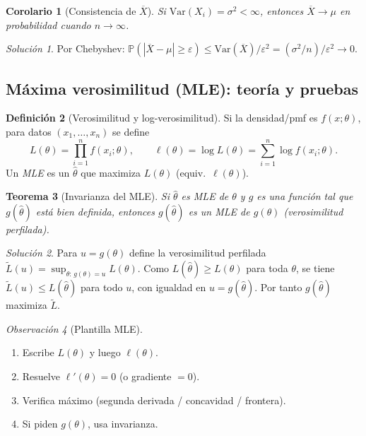 \documentclass[11pt]{article}
\theoremstyle{plain}
\newtheorem{theorem}{Teorema}[section]
\newtheorem{corollary}[theorem]{Corolario}
\theoremstyle{definition}
\newtheorem{definition}[theorem]{Definición}
\theoremstyle{remark}
\newtheorem{remark}[theorem]{Observación}
\theoremstyle{solstyle}
\newtheorem*{solution}{Solución}
\newcommand{\Var}{\mathrm{Var}}
\newcommand{\Pbb}{\mathbb{P}}
\newcommand{\1}{\mathbbm{1}}
\newcommand{\Xbar}{\overline{X}}
\begin{document}
\begin{corollary}[Consistencia de $\Xbar$]\label{cor:consistency-Xbar}
Si $\Var(X_i)=\sigma^2<\infty$, entonces $\Xbar\to \mu$ en probabilidad cuando $n\to\infty$.
\end{corollary}

\begin{solution}
Por Chebyshev: $\Pbb(|\Xbar-\mu|\ge\varepsilon)\le \Var(\Xbar)/\varepsilon^2=(\sigma^2/n)/\varepsilon^2\to 0$.
\end{solution}

\subsection{Máxima verosimilitud (MLE): teoría y pruebas}

\begin{definition}[Verosimilitud y log-verosimilitud]
Si la densidad/pmf es $f(x;\theta)$, para datos $(x_1,\dots,x_n)$ se define
\[
L(\theta)=\prod_{i=1}^n f(x_i;\theta),
\qquad
\ell(\theta)=\log L(\theta)=\sum_{i=1}^n \log f(x_i;\theta).
\]
Un \emph{MLE} es un $\widehat\theta$ que maximiza $L(\theta)$ (equiv.\ $\ell(\theta)$).
\end{definition}

\begin{theorem}[Invarianza del MLE]\label{thm:invarianceMLE}
Si $\widehat\theta$ es MLE de $\theta$ y $g$ es una función tal que $g(\widehat\theta)$ está bien definida,
entonces $g(\widehat\theta)$ es un MLE de $g(\theta)$ (verosimilitud perfilada).
\end{theorem}

\begin{solution}
Para $u=g(\theta)$ define la verosimilitud perfilada
$\widetilde L(u)=\sup_{\theta:\,g(\theta)=u}L(\theta)$.
Como $L(\widehat\theta)\ge L(\theta)$ para toda $\theta$, se tiene $\widetilde L(u)\le L(\widehat\theta)$ para todo $u$,
con igualdad en $u=g(\widehat\theta)$. Por tanto $g(\widehat\theta)$ maximiza $\widetilde L$.
\end{solution}

\begin{remark}[Plantilla MLE]
\begin{enumerate}[label=\textbf{(\arabic*)},leftmargin=2.2em]
\item Escribe $L(\theta)$ y luego $\ell(\theta)$.
\item Resuelve $\ell'(\theta)=0$ (o gradiente $=0$).
\item Verifica máximo (segunda derivada / concavidad / frontera).
\item Si piden $g(\theta)$, usa invarianza.
\end{enumerate}
\end{remark}
\end{document}

